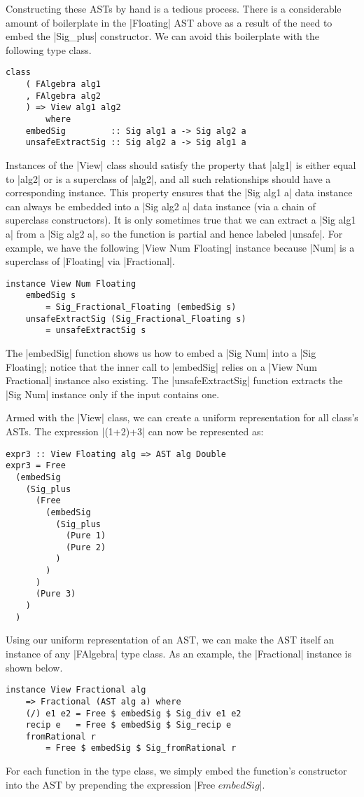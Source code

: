 \documentclass[preprint]{sigplanconf}
\theoremstyle{definition}
\begin{document}
Constructing these ASTs by hand is a tedious process.
There is a considerable amount of boilerplate in the |Floating| AST above as a result of the need to embed the |Sig_plus| constructor.
We can avoid this boilerplate with the following type class.
\begin{lstlisting}
class
    ( FAlgebra alg1
    , FAlgebra alg2
    ) => View alg1 alg2
        where
    embedSig         :: Sig alg1 a -> Sig alg2 a
    unsafeExtractSig :: Sig alg2 a -> Sig alg1 a
\end{lstlisting}
Instances of the |View| class should satisfy the property that |alg1| is either equal to |alg2| or is a superclass of |alg2|, and
all such relationships should have a corresponding instance.
This property ensures that the |Sig alg1 a| data instance can always be embedded into a |Sig alg2 a| data instance (via a chain of superclass constructors).
It is only sometimes true that we can extract a |Sig alg1 a| from a |Sig alg2 a|,
so the function is partial and hence labeled |unsafe|.
For example,
we have the following |View Num Floating| instance because |Num| is a superclass of |Floating| via |Fractional|.
\begin{lstlisting}
instance View Num Floating
    embedSig s
        = Sig_Fractional_Floating (embedSig s)
    unsafeExtractSig (Sig_Fractional_Floating s)
        = unsafeExtractSig s
\end{lstlisting}
The |embedSig| function shows us how to embed a |Sig Num| into a |Sig Floating|;
notice that the inner call to |embedSig| relies on a |View Num Fractional| instance also existing.
The |unsafeExtractSig| function extracts the |Sig Num| instance only if the input contains one.

Armed with the |View| class, we can create a uniform representation for all class's ASTs.
The expression |(1+2)+3| can now be represented as:
\begin{lstlisting}
expr3 :: View Floating alg => AST alg Double
expr3 = Free
  (embedSig
    (Sig_plus
      (Free
        (embedSig
          (Sig_plus
            (Pure 1)
            (Pure 2)
          )
        )
      )
      (Pure 3)
    )
  )
\end{lstlisting}

Using our uniform representation of an AST,
we can make the AST itself an instance of any |FAlgebra| type class.
As an example, the |Fractional| instance is shown below.
\begin{lstlisting}
instance View Fractional alg
    => Fractional (AST alg a) where
    (/) e1 e2 = Free $ embedSig $ Sig_div e1 e2
    recip e   = Free $ embedSig $ Sig_recip e
    fromRational r
        = Free $ embedSig $ Sig_fromRational r
\end{lstlisting}
For each function in the type class,
we simply embed the function's constructor into the AST by prepending the expression |Free $ embedSig $|.
\end{document}
